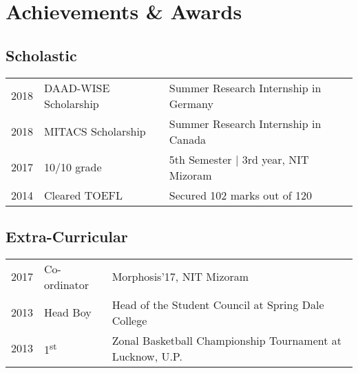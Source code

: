 
\section{Achievements \& Awards} 
\subsection{Scholastic}
\begin{tabular}{rll}
2018         & DAAD-WISE Scholarship & Summer Research Internship in Germany\\
2018         & MITACS Scholarship & Summer Research Internship in Canada\\
2017	     & 10/10 grade  & 5th Semester | 3rd year, NIT Mizoram\\
2014         & Cleared TOEFL  & Secured 102 marks out of 120 \\
\end{tabular}
\sectionsep

\subsection{Extra-Curricular}
\begin{tabular}{rll}
2017         & Co-ordinator  & Morphosis'17, NIT Mizoram \\
2013         & Head Boy  & Head of the Student Council at Spring Dale College \\
2013         & 1\textsuperscript{st}  & Zonal Basketball Championship Tournament at Lucknow, U.P. \\
\end{tabular}
\sectionsep